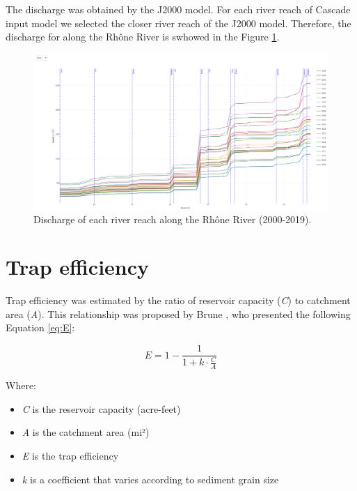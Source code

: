 \documentclass[
]{book}
\providecommand{\tightlist}{%
  \setlength{\itemsep}{0pt}\setlength{\parskip}{0pt}}
\begin{document}
The discharge was obtained by the J2000 model. For each river reach of Cascade input model we selected the closer river reach of the J2000 model. Therefore, the discharge for along the Rhône River is swhowed in the Figure \ref{fig:q}.

\begin{figure}
\includegraphics[width=26.67in]{img/discharge} \caption{Discharge of each river reach along the Rhône River (2000-2019).}\label{fig:q}
\end{figure}

\section{\texorpdfstring{Trap efficiency \citep{GILL1979}}{Trap efficiency {[}@GILL1979{]}}}\label{trap-efficiency-gill1979}

Trap efficiency was estimated by the ratio of reservoir capacity (\emph{C}) to catchment area (\emph{A}). This relationship was proposed by Brune \citeyearpar{Brune53}, who presented the following Equation \eqref{eq:E}:

\begin{equation}
  E = 1 - \frac{1}{1 + k \cdot \frac{C}{A}}
  \label{eq:E}
\end{equation}

Where:

\begin{itemize}
\tightlist
\item
  \emph{C} is the reservoir capacity (acre-feet)\\
\item
  \emph{A} is the catchment area (mi²)\\
\item
  \emph{E} is the trap efficiency\\
\item
  \emph{k} is a coefficient that varies according to sediment grain size
\end{itemize}
\end{document}

